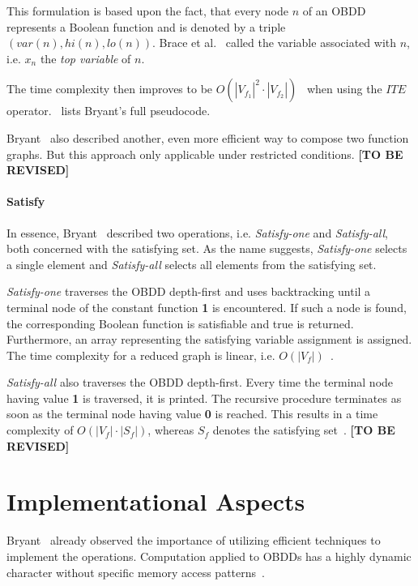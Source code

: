 \documentclass{vldb}
\newcommand{\tbr}{\textbf{[TO BE REVISED]}}
\begin{document}
This formulation is based upon the fact, that every node $n$ of an OBDD represents
a Boolean function and is denoted by a triple $(var(n), hi(n), lo(n))$. Brace et
al.~\cite{BRACE90} called the variable associated with $n$, i.e. $x_n$ the
\textit{top variable} of $n$.

The time complexity then improves to be
$O\left(|V_{f_1}|^2 \cdot |V_{f_2}|\right)$~\cite{BRYANT86} when using the $ITE$
operator.~\cite[p. 686]{BRYANT86} lists Bryant's full pseudocode.

Bryant~\cite{BRYANT86} also described another, even more efficient way to compose
two function graphs. But this approach only applicable under restricted conditions.
\tbr

\paragraph*{Satisfy}
\mbox{} %

In essence, Bryant~\cite{BRYANT86} described two operations, i.e.
\textit{Satisfy-one} and \textit{Satisfy-all}, both concerned with the satisfying
set. As the name suggests, \textit{Satisfy-one} selects a single element and
\textit{Satisfy-all} selects all elements from the satisfying set.

\textit{Satisfy-one} traverses the OBDD depth-first and uses backtracking until
a terminal node of the constant function \textbf{1} is encountered. If such a
node is found, the corresponding Boolean function is satisfiable and true is
returned. Furthermore, an array representing the satisfying variable assignment
is assigned. The time complexity for a reduced graph is linear, i.e.
$O(|V_f|)$~\cite{BRYANT86}.

\textit{Satisfy-all} also traverses the OBDD depth-first. Every time the terminal
node having value \textbf{1} is traversed, it is printed. The recursive procedure
terminates as soon as the terminal node having value \textbf{0} is reached. This
results in a time complexity of $O(|V_f| \cdot |S_f|)$, whereas $S_f$ denotes the
satisfying set~\cite{BRYANT86}. \tbr

\section{Implementational Aspects}
\label{sec:implementational-aspects}

Bryant~\cite{BRYANT86} already observed the importance of utilizing efficient
techniques to implement the operations. Computation applied to OBDDs has a highly
dynamic character without specific memory access patterns~\cite{BRYANT92}.
\end{document}
